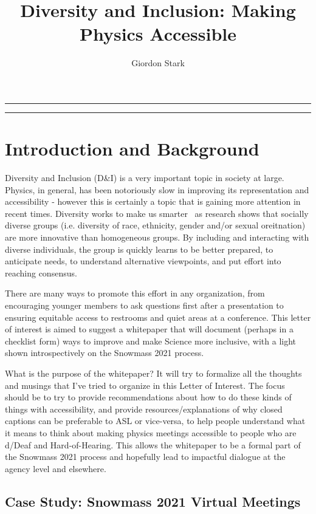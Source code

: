 \documentclass{article}
\title{Diversity and Inclusion: Making Physics Accessible}
\author[a]{Giordon Stark}
\affil[a]{SCIPP, UC Santa Cruz}
\date{}
\begin{document}
  \maketitle
  \hrule
  \vspace{0.5em}
  \hrule
  \vspace{2.5em}
  \section{Introduction and Background}
  Diversity and Inclusion (D\&I) is a very important topic in society at large. Physics, in general, has been notoriously slow in improving its representation and accessibility - however this is certainly a topic that is gaining more attention in recent times. Diversity works to make us smarter~\cite{HowDiversityWorks} as research shows that socially diverse groups (i.e. diversity of race, ethnicity, gender and/or sexual oreitnation) are more innovative than homogeneous groups. By including and interacting with diverse individuals, the group is quickly learns to be better prepared, to anticipate needs, to understand alternative viewpoints, and put effort into reaching consensus.

  There are many ways to promote this effort in any organization, from encouraging younger members to ask questions first after a presentation to ensuring equitable access to restrooms and quiet areas at a conference. This letter of interest is aimed to suggest a whitepaper that will document (perhaps in a checklist form) ways to improve and make Science more inclusive, with a light shown introspectively on the Snowmass 2021 process.

  What is the purpose of the whitepaper? It will try to formalize all the thoughts and musings that I've tried to organize in this Letter of Interest. The focus should be to try to provide recommendations about how to do these kinds of things with accessibility, and provide resources/explanations of why closed captions can be preferable to ASL or vice-versa, to help people understand what it means to think about making physics meetings accessible to people who are d/Deaf and Hard-of-Hearing. This allows the whitepaper to be a formal part of the Snowmass 2021 process and hopefully lead to impactful dialogue at the agency level and elsewhere.

  \subsection{Case Study: Snowmass 2021 Virtual Meetings}
\end{document}
